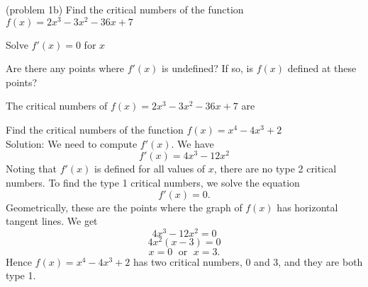 \documentclass[handout]{ximera}
\begin{document}
\begin{problem}(problem 1b)
  Find the critical numbers of the function $f(x) = 2x^3 - 3x^2 -36x + 7$
    
		\begin{hint}
      Solve $f'(x) = 0$ for $x$
    \end{hint}
    \begin{hint}
      Are there any points where $f'(x)$ is undefined?
      If so, is $f(x)$ defined at these points?  
		\end{hint}
    
    
		The critical numbers of $f(x) = 2x^3 - 3x^2 -36x + 7$ are
		\begin{multipleChoice}
		\end{multipleChoice}
		\end{problem}

\begin{example}[example 2]
Find the critical numbers of the function $f(x) = x^4 - 4x^3 + 2$\\
Solution: We need to compute $f'(x)$.  We have
\[f'(x) = 4x^3 - 12x^2\]
Noting that $f'(x)$ is defined for all values of $x$, there are no type 2 critical numbers.
To find the type 1 critical numbers, we solve the equation
\[f'(x) = 0.\]
Geometrically, these are the points where the graph of $f(x)$ has horizontal tangent lines.
We get
\[ 4x^3 - 12x^2 =0\]
\[ 4x^2(x-3) =0\]
\[x = 0 \;\mbox{  or  }\; x = 3.\]
Hence $f(x) = x^4 - 4x^3 + 2$ has two critical numbers, $0$ and $3$, and they are both type 1.
\begin{image}
\end{image}

\end{example}
\end{document}
